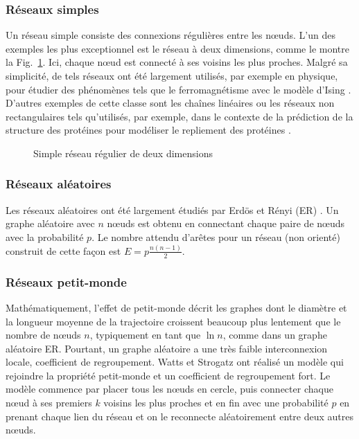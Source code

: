 \subsubsection{Réseaux simples}
Un réseau simple consiste des connexions régulières entre les nœuds. L'un des exemples les plus exceptionnel est le réseau à deux dimensions, comme le montre la Fig.~\ref{Ising2}. Ici, chaque nœud est connecté à ses voisins les plus proches. Malgré sa simplicité, de tels réseaux ont été largement utilisés, par exemple en physique, pour étudier des phénomènes tels que le ferromagnétisme avec le modèle d'Ising \cite{Chowdhury-Stauffer2000}. D'autres exemples de cette classe sont les chaînes linéaires ou les réseaux non rectangulaires tels qu'utilisés, par exemple, dans le contexte de la prédiction de la structure des protéines pour modéliser le repliement des protéines \cite{Hsu-al2003,Dehmer2011}.
\begin{figure}[h!]
	\centering
	\caption{Simple réseau régulier de deux dimensions}
	\label{Ising2}
\end{figure}
\subsubsection{Réseaux aléatoires}
Les réseaux aléatoires ont été largement étudiés par Erdös et Rényi (ER) \cite{Erdos-Renyi1959,Erdos-Renyi1960,Erdos-Renyi1961}.
Un graphe aléatoire avec $n$ nœuds est obtenu en connectant chaque paire de nœuds avec la probabilité $p$. Le nombre attendu d'arêtes pour un réseau (non orienté) construit
de cette façon est $E=p\frac{n(n-1)}{2}$.
\subsubsection{Réseaux petit-monde}
Mathématiquement, l'effet de petit-monde décrit les graphes dont le diamètre et la longueur moyenne de la trajectoire croissent beaucoup plus lentement que le nombre de nœuds $n$, typiquement en tant que $\ln n$, comme dans un graphe aléatoire ER. Pourtant, un graphe aléatoire a une très faible interconnexion locale, coefficient de regroupement. Watts et Strogatz \cite{Watss-Strogatz1998} ont réalisé un modèle qui rejoindre la propriété petit-monde et un coefficient de regroupement fort. Le modèle commence par placer tous les nœuds en cercle, puis connecter chaque nœud à ses premiers $k$ voisins les plus proches et en fin avec une probabilité $p$ en prenant chaque lien du réseau et on le reconnecte aléatoirement entre deux autres nœuds.
